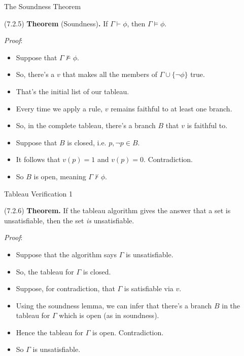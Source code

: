 \begin{frame}{The Soundness Theorem}

(7.2.5) \textbf{Theorem} (Soundness)\textbf{.} If $\Gamma\vdash\phi$, then $\Gamma\vDash\phi$.


	\emph{Proof}:

	\begin{itemize}
	
		\item Suppose that $\Gamma\nvDash\phi$.
		
		\item So, there's a $v$ that makes all the members of $\Gamma\cup\{\neg\phi\}$ true.
		
		\item That's the initial list of our tableau.
		
		\item Every time we apply a rule, $v$ remains faithful to at least one branch.
		
		\item So, in the complete tableau, there's a branch $B$ that $v$ is faithful to.
		
		\item Suppose that $B$ is closed, i.e. $p,\neg p\in B$. 
		
		\item It follows that $v(p)=1$ and $v(p)=0$. Contradiction.
		
		\item So $B$ is open, meaning $\Gamma\nvdash\phi$.
	
	\end{itemize}

\end{frame}

\begin{frame}{Tableau Verification 1}

	(7.2.6) \textbf{Theorem.} If the tableau algorithm gives the answer that a set is unsatisfiable, then the set \emph{is} unsatisfiable. 

	\emph{Proof}:
	
	\begin{itemize}
	
		\item Suppose that the algorithm says $\Gamma$ is unsatisfiable.
		
		\item So, the tableau for $\Gamma$ is closed.
		
		\item Suppose, for contradiction, that $\Gamma$ is satisfiable via $v$.
		
		\item Using the soundness lemma, we can infer that there's a branch $B$ in the tableau for $\Gamma$ which is open (as in soundness). 
	
		\item Hence the tableau for $\Gamma$ is open. Contradiction.
		
		\item So $\Gamma$ is unsatisfiable.
	
	\end{itemize}

\end{frame}

